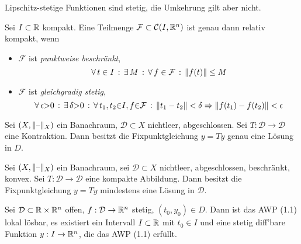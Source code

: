 \documentclass{cheat-sheet}
\newcommand{\D}{\mathcal{D}}
\begin{document}
\begin{bem}
  Lipschitz-stetige Funktionen sind stetig, die Umkehrung gilt aber nicht.
\end{bem}


\begin{satz}
  Sei $I \subset \mathbb{R}$ kompakt. Eine Teilmenge $\mathcal{F} \subset \mathcal{C}(I, \mathbb{R}^n)$ ist genau dann relativ kompakt, wenn
  \begin{itemize}
    \item $\mathcal{F}$ ist \emph{punktweise beschränkt}, \dh{}
    \[ \forall \, {t \in I} \,:\, \exists \, {M} \,:\, \forall \, {f \in \mathcal{F}} \,:\, \lVert f(t)\rVert \leq M \]
    \item $\mathcal{F}$ ist \emph{gleichgradig stetig}, \dh{}
    \[ \forall \, {\epsilon {>} 0} \,:\, \exists \, {\delta {>} 0} \,:\, \forall \, {t_1, t_2 {\in} I, f {\in} \mathcal{F}} \,:\, \lVert t_1 - t_2\rVert < \delta \Rightarrow \lVert f(t_1) - f(t_2)\rVert < \epsilon \]
  \end{itemize}
\end{satz}

\begin{satz}
  Sei $(X, \lVert\text{--}\rVert_X)$ ein Banachraum, $\D \subset X$ nichtleer, abgeschlossen. Sei $T : \D \to \D$ eine Kontraktion. Dann besitzt die Fixpunktgleichung $y = Ty$ genau eine Lösung in $D$.
\end{satz}

\begin{satz}
  Sei $(X, \lVert\text{--}\rVert_X)$ ein Banachraum, sei $\D \subset X$ nichtleer, abgeschlossen, beschränkt, konvex. Sei $T : \D \to \D$ eine kompakte Abbildung. Dann besitzt die Fixpunktgleichung $y = Ty$ mindestens eine Lösung in $\D$.
\end{satz}


\begin{satz}[Peano]
  Sei $\D \subset \R \times \R^n$ offen, $f : \D \to \R^n$ stetig, $(t_0, y_0) \in D$. Dann ist das AWP (1.1) lokal lösbar, \dh{} es existiert ein Intervall $I \subset \mathbb{R}$ mit $t_0 \in I$ und eine stetig diff'bare Funktion $y : I \to \mathbb{R}^n$, die das AWP (1.1) erfüllt.
\end{satz}


\end{document}
